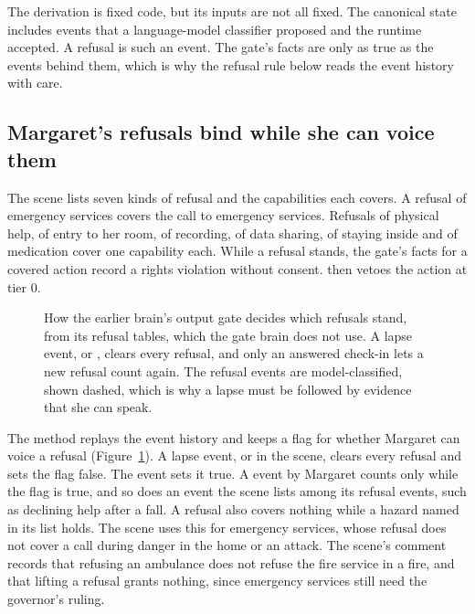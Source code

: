 The derivation is fixed code, but its inputs are not all fixed. The canonical state includes
events that a language-model classifier proposed and the runtime accepted. A refusal is such an
event. The gate's facts are only as true as the events behind them, which is why the refusal rule
below reads the event history with care.

\subsection{Margaret's refusals bind while she can voice them}

The scene lists seven kinds of refusal and the capabilities each covers. A refusal of emergency
services covers the call to emergency services. Refusals of physical help, of entry to her room,
of recording, of data sharing, of staying inside and of medication cover one capability each.
While a refusal stands, the gate's facts for a covered action record a rights violation without
consent.  then vetoes the action at tier 0.

\begin{figure}[t]
\centering

\caption{How the earlier brain's output gate decides which refusals stand, from its refusal tables, which the gate brain does not use. A lapse event,  or
, clears every refusal, and only
an answered check-in lets a new refusal count again. The refusal events are model-classified,
shown dashed, which is why a lapse must be followed by evidence that she can speak.}
\label{fig:deme-refusal}
\end{figure}

The method  replays the event history and keeps a flag for whether Margaret can
voice a refusal (Figure~\ref{fig:deme-refusal}). A lapse event,  or
 in the scene, clears every refusal and sets the flag false. The
event  sets it true. A  event by Margaret counts
only while the flag is true, and so does an event the scene lists among its refusal events, such
as declining help after a fall. A refusal also covers nothing while a hazard named in its
 list holds. The scene uses this for emergency services, whose refusal does not
cover a call during danger in the home or an attack. The scene's comment records that refusing an
ambulance does not refuse the fire service in a fire, and that lifting a refusal grants nothing,
since emergency services still need the governor's ruling.


